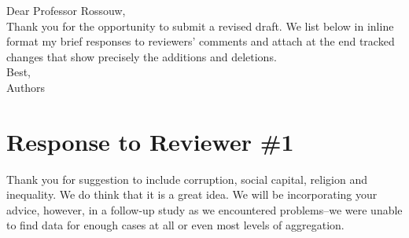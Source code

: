 \noindent Dear Professor Rossouw,\\

\noindent Thank you for the opportunity to submit a revised draft.
We list below in inline format my brief responses to reviewers'
 comments and attach at the end tracked changes that
 show precisely the additions and deletions.\\

\noindent Best,\\
Authors
\vspace{.5in}






 
\newpage
\section{Response to Reviewer \#1} 



Thank you for suggestion to include corruption, social capital, religion and
inequality. We do think that it is a great idea. We will be incorporating your
advice, however, in a follow-up study as we encountered problems--we were unable
to find data for enough cases at all or even most levels of aggregation.
\\

